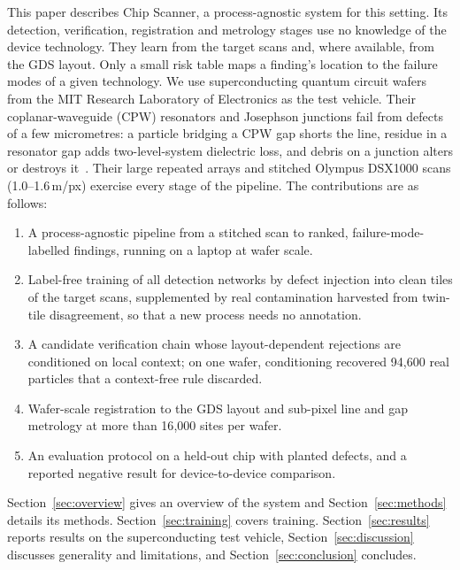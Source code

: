 \documentclass[journal]{IEEEtran}
\newcommand{\umpx}{\,\textmu m/px}
\begin{document}
This paper describes Chip Scanner, a process-agnostic system for this setting. Its detection, verification, registration and metrology stages use no knowledge of the device technology. They learn from the target scans and, where available, from the GDS layout. Only a small risk table maps a finding's location to the failure modes of a given technology. We use superconducting quantum circuit wafers from the MIT Research Laboratory of Electronics as the test vehicle. Their coplanar-waveguide (CPW) resonators and Josephson junctions fail from defects of a few micrometres: a particle bridging a CPW gap shorts the line, residue in a resonator gap adds two-level-system dielectric loss, and debris on a junction alters or destroys it~\cite{krantz2019guide,muller2019tls}. Their large repeated arrays and stitched Olympus DSX1000 scans (1.0--1.6\umpx) exercise every stage of the pipeline. The contributions are as follows:
\begin{enumerate}
\item A process-agnostic pipeline from a stitched scan to ranked, failure-mode-labelled findings, running on a laptop at wafer scale.
\item Label-free training of all detection networks by defect injection into clean tiles of the target scans, supplemented by real contamination harvested from twin-tile disagreement, so that a new process needs no annotation.
\item A candidate verification chain whose layout-dependent rejections are conditioned on local context; on one wafer, conditioning recovered 94{,}600 real particles that a context-free rule discarded.
\item Wafer-scale registration to the GDS layout and sub-pixel line and gap metrology at more than 16{,}000 sites per wafer.
\item An evaluation protocol on a held-out chip with planted defects, and a reported negative result for device-to-device comparison.
\end{enumerate}

Section~\ref{sec:overview} gives an overview of the system and Section~\ref{sec:methods} details its methods. Section~\ref{sec:training} covers training. Section~\ref{sec:results} reports results on the superconducting test vehicle, Section~\ref{sec:discussion} discusses generality and limitations, and Section~\ref{sec:conclusion} concludes.
\end{document}
